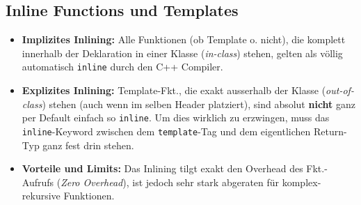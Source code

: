 \subsection{Inline Functions und Templates}

\begin{itemize}
    \item \textbf{Implizites Inlining:} Alle Funktionen (ob Template o. nicht), die komplett innerhalb der Deklaration in einer Klasse (\textit{in-class}) stehen, gelten als völlig automatisch \texttt{inline} durch den C++ Compiler.
    \item \textbf{Explizites Inlining:} Template-Fkt., die exakt ausserhalb der Klasse (\textit{out-of-class}) stehen (auch wenn im selben Header platziert), sind absolut \textbf{nicht} ganz per Default einfach so \texttt{inline}. 
    Um dies wirklich zu erzwingen, muss das \texttt{inline}-Keyword zwischen dem \texttt{template}-Tag und dem eigentlichen Return-Typ ganz fest drin stehen.
    \item \textbf{Vorteile und Limits:} Das Inlining tilgt exakt den Overhead des Fkt.-Aufrufs (\textit{Zero Overhead}), ist jedoch sehr stark abgeraten für komplex-rekursive Funktionen.
\end{itemize}